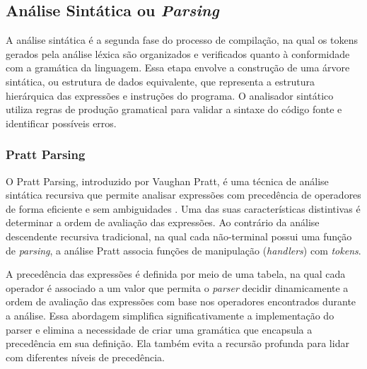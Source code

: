 \documentclass[english, 
               brazil, 
               bsc] %
               {dcomp-abntex2}
\begin{document}
\subsection{Análise Sintática ou \textit{Parsing}}
A análise sintática é a segunda fase do processo de compilação, na qual os tokens gerados pela análise léxica são organizados e verificados quanto à conformidade com a gramática da linguagem. Essa etapa envolve a construção de uma árvore sintática, ou estrutura de dados equivalente, que representa a estrutura hierárquica das expressões e instruções do programa. O analisador sintático utiliza regras de produção gramatical para validar a sintaxe do código fonte e identificar possíveis erros.

\subsubsection{Pratt Parsing}
O Pratt Parsing, introduzido por Vaughan Pratt, é uma técnica de análise sintática recursiva que permite analisar expressões com precedência de operadores de forma eficiente e sem ambiguidades \cite{pratt}. Uma das suas características distintivas é determinar a ordem de avaliação das expressões. Ao contrário da análise descendente recursiva tradicional, na qual cada não-terminal possui uma função de \textit{parsing}, a análise Pratt associa funções de manipulação (\textit{handlers}) com \textit{tokens}.

A precedência das expressões é definida por meio de uma tabela, na qual cada operador é associado a um valor que permita o \textit{parser} decidir dinamicamente a ordem de avaliação das expressões com base nos operadores encontrados durante a análise. Essa abordagem simplifica significativamente a implementação do parser e elimina a necessidade de criar uma gramática que encapsula a precedência em sua definição. Ela também evita a recursão profunda para lidar com diferentes níveis de precedência.
\end{document}
